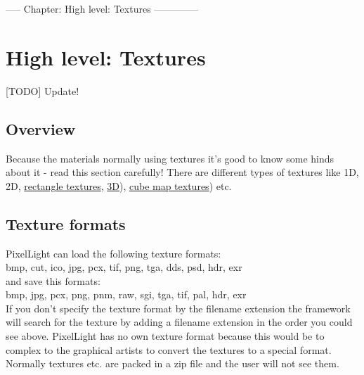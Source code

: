 ----- Chapter: High level: Textures --------------
\chapter{High level: Textures}


[TODO] Update!


\section{Overview}
Because the materials normally using textures it's good to know some hinds about it - read this
section carefully!
There are different types of textures like 1D, 2D, \hyperlink{Rectangle textures}{rectangle textures},
\hyperlink{3D textures}{3D}), \hyperlink{Cube maps}{cube map textures}) etc.




\section{Texture formats}
PixelLight can load the following texture formats:\\

bmp, cut, ico, jpg, pcx, tif, png, tga, dds, psd, hdr, exr\\

and save this formats:\\

bmp, jpg, pcx, png, pnm, raw, sgi, tga, tif, pal, hdr, exr\\

If you don't specify the texture format by the filename extension the framework will search for the
texture by adding a filename extension in the order you could see above. PixelLight has no own texture format
because this would be to complex to the graphical artists to convert the textures to a special format.
Normally textures etc. are packed in a zip file and the user will not see them.

